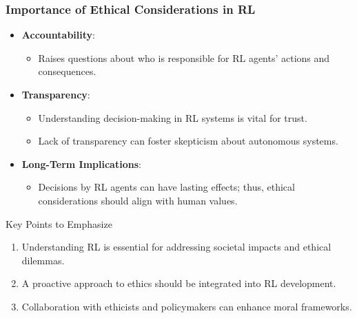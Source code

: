 \documentclass[aspectratio=169]{beamer}
\begin{document}
\begin{frame}[fragile]
    \frametitle{Importance of Ethical Considerations in RL}
    \begin{itemize}
        \item \textbf{Accountability}: 
            \begin{itemize}
                \item Raises questions about who is responsible for RL agents' actions and consequences.
            \end{itemize}
        \item \textbf{Transparency}: 
            \begin{itemize}
                \item Understanding decision-making in RL systems is vital for trust.
                \item Lack of transparency can foster skepticism about autonomous systems.
            \end{itemize}
        \item \textbf{Long-Term Implications}: 
            \begin{itemize}
                \item Decisions by RL agents can have lasting effects; thus, ethical considerations should align with human values.
            \end{itemize}
    \end{itemize}
    \begin{block}{Key Points to Emphasize}
        \begin{enumerate}
            \item Understanding RL is essential for addressing societal impacts and ethical dilemmas.
            \item A proactive approach to ethics should be integrated into RL development.
            \item Collaboration with ethicists and policymakers can enhance moral frameworks.
        \end{enumerate}
    \end{block}
\end{frame}
\end{document}
